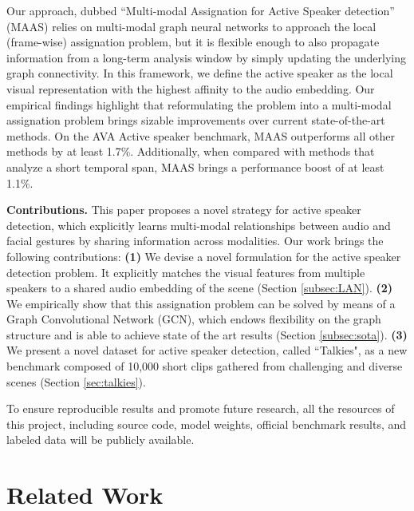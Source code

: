 \documentclass[10pt,twocolumn,letterpaper]{article}
\begin{document}
Our approach, dubbed ``Multi-modal Assignation for Active Speaker detection'' (MAAS) relies on multi-modal graph neural networks \cite{kipf2016semi, wang2018dynamic} to approach the local (frame-wise) assignation problem, but it is flexible enough to also propagate information from a long-term analysis window by simply updating the underlying graph connectivity. In this framework, we define the active speaker as the local visual representation with the highest affinity to the audio embedding. Our empirical findings highlight that reformulating the problem into a multi-modal assignation problem brings sizable improvements over current state-of-the-art methods. On the AVA Active speaker benchmark, MAAS outperforms all other methods by at least 1.7\%. Additionally, when compared with methods that analyze a short temporal span, MAAS brings a performance boost of at least 1.1\%.

\noindent\textbf{Contributions.} This paper proposes a novel strategy for active speaker detection, which explicitly learns multi-modal relationships between audio and facial gestures by sharing information across modalities. Our work brings the following contributions: \textbf{(1)} We devise a novel formulation for the active speaker detection problem. It explicitly matches the visual features from multiple speakers to a shared audio embedding of the scene (Section \ref{subsec:LAN}). 
\textbf{(2)} We empirically show that this assignation problem can be solved by means of a Graph Convolutional Network (GCN), which endows flexibility on the graph structure and is able to achieve state of the art results (Section \ref{subsec:sota}). 
\textbf{(3)} We present a novel dataset for active speaker detection, called ``Talkies", as a new benchmark composed of 10,000 short clips gathered from challenging and diverse scenes (Section \ref{sec:talkies}).

To ensure reproducible results and promote future research, all the resources of this project, including source code, model weights, official benchmark results, and labeled data will be publicly available.

 \section{Related Work}
\end{document}
